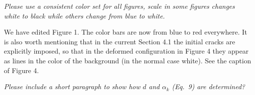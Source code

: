 \documentclass{elsarticle}
\newcommand{\Comment}[1]{{\color{green}\vspace{5 mm}\par \noindent
  \marginpar{\textsc{Comment}} \framebox{\begin{minipage}[c]{0.95
        \textwidth} \tt #1 \end{minipage}}\vspace{5 mm}\par}}
\newcommand{\review}[1]{ \textit{#1}}
\begin{document}
\bigskip

    \review{Please use a consistent color set for all figures, scale in some figures changes white to black while others change from blue to white.}


{We have edited Figure 1. The color bars are now from blue to red everywhere. It is also worth mentioning that in the current Section 4.1 the initial cracks are explicitly imposed, so that in the deformed configuration in Figure 4 they appear as lines in the color of the background (in the normal case white). See the caption of Figure 4.}

\bigskip

    \review{Please include a short paragraph to show how $d$ and $\alpha_k$ (Eq.~9) are determined?}

\end{document}
